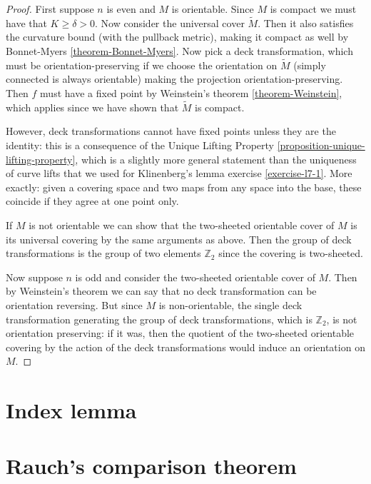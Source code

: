 \begin{proof}
First suppose $n$ is even and $M$ is orientable. Since $M$ is compact we must
have that $K\geq \delta>0$. Now consider the universal cover $\tilde{M}$. Then
it also satisfies the curvature bound (with the pullback metric), 
making it compact as well by Bonnet-Myers \ref{theorem-Bonnet-Myers}. 
Now pick a deck transformation, which must be
orientation-preserving if we choose the orientation on $\tilde{M}$ (simply
connected is always orientable) making the projection orientation-preserving.
Then $f$ must have a fixed point by Weinstein's theorem \ref{theorem-Weinstein},
which applies since we have shown that $\tilde{M}$ is compact. 

However, deck transformations cannot have fixed points unless they are the 
identity: this is a consequence of the Unique Lifting Property
 \ref{proposition-unique-lifting-property}, which is a 
slightly more general statement than the uniqueness of curve lifts that we 
used for Klinenberg's lemma exercise \ref{exercise-l7-1}. 
More exactly: given a covering space and two maps from any space into the base, 
these coincide if they agree at one point only.

If $M$ is not orientable we can show that the two-sheeted orientable cover of
$M$ is its universal covering by the same arguments as above. Then the group of
deck transformations is the group of two elements $\mathbb{Z}_2$ since the
covering is two-sheeted.

Now suppose $n$ is odd and consider the two-sheeted orientable cover of $M$.
Then by Weinstein's theorem we can say that no deck transformation can be
orientation reversing. But since $M$ is non-orientable, the single deck
transformation generating the group of deck transformations, which is
$\mathbb{Z}_2$, is not orientation preserving: if it was, then the quotient of
the two-sheeted orientable covering by the action of the deck transformations
would induce an orientation on $M$.
\end{proof}

\section{Index lemma}
\label{subsection-index-lemma}

\section{Rauch's comparison theorem}
\label{section-Rauch}

